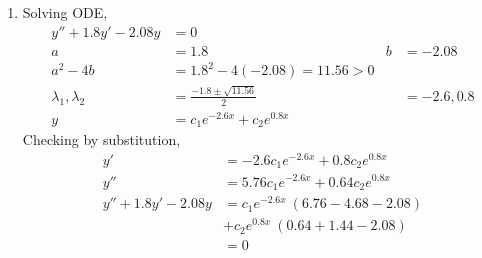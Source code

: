 \begin{enumerate}
    \item Solving ODE,
          \begin{align}
              y'' + 1.8y' - 2.08y      & = 0                                 \\
              a                        & = 1.8                             &
              b                        & = -2.08                             \\
              a^{2} - 4b               & = 1.8^{2} - 4(-2.08) = 11.56 > 0    \\
              \lambda_{1}, \lambda_{2} & = \frac{-1.8 \pm \sqrt{11.56}}{2} &
                                       & = -2.6, 0.8                         \\
              y                        & = c_{1}e^{-2.6x} + c_{2}e^{0.8x}
          \end{align}
          Checking by substitution,
          \begin{align}
              y'                  & = -2.6c_{1}e^{-2.6x} + 0.8c_{2}e^{0.8x}  \\
              y''                 & = 5.76c_{1}e^{-2.6x} + 0.64c_{2}e^{0.8x} \\
              y'' + 1.8y' - 2.08y & = c_{1}e^{-2.6x}\ (6.76 - 4.68 - 2.08)   \\
                                  & + c_{2}e^{0.8x}\ (0.64 + 1.44 - 2.08)    \\
                                  & = 0
          \end{align}


\end{enumerate}
